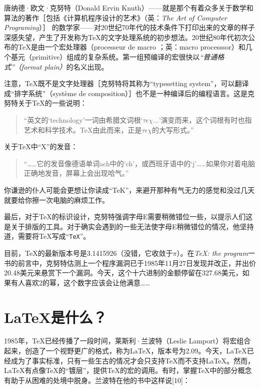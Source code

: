 唐纳德·欧文·克努特（Donald Ervin Knuth）——就是那个有着众多关于数学和算法的著作［包括《计算机程序设计的艺术》（英：\textit{The Art of Computer Programing}）］%
的数学家——对20世纪70年代的技术条件下打印出来的文章的样子深感失望，产生了开发称为\TeX 的文字处理系统的初步想法。20世纪80年代初次公布的\TeX 是由一个宏处理器（processeur de macro ；英：macro processsor）和几个基元（primitive）组成的复杂系统。第一组预编译的宏很快以\textit{“普通格式”（format plain）}的名义出现。

注意，\TeX 既不是文字处理器［克努特将其称为“typesetting system”，可以翻译成“排字系统”（système de composition）］也不是一种编译后的编程语言。这是克努特关于\TeX 的一些说明：

\begin{quote}
    “英文的‘technology’一词由希腊文词根‘$ \tau\epsilon\chi...$’演变而来，这个词根有时也指艺术和科学技术。\TeX 由此而来，正是$ \tau\epsilon\chi$的大写形式。”
\end{quote}

关于\TeX 中“X”的发音：

\begin{quote}
    “……它的发音像德语单词ach中的‘ch’，或西班牙语中的‘j’……如果你对着电脑正确地发音，屏幕上会出现哈气。”
\end{quote}

你谦逊的仆人可能会更想让你读成“TeK”，来避开那种有气无力的感觉和没过几天就要给你擦一次电脑的麻烦工作。

最后，对于\TeX 的标识设计，克努特强调字母E需要稍微错位一些，以提示人们这是关于排版的工具。对于确实会遇到的一些无法使字母E稍微错位的情况，他坚持道，需要将\TeX 写成“\texttt{TeX}”。

目前，\TeX 的最新版本号是3.1415926（没错，它收敛于$\pi$）。在\textit{\TeX : the program}一书的前言中，克努特估测上一个程序漏洞已于1985年11月27日发现并改正，并出价20.48美元来悬赏下一个漏洞。今天，这个十六进制的金额停留在327.68美元，如果有人喜欢2的幂，这个数字应该会让他满意……

\section*{\LaTeX 是什么？}

1985年，\TeX 已经传播了一段时间，莱斯利·兰波特（Leslie Lamport）将宏组合起来，创造了一个视野更广的格式，称为\LaTeX ，版本号为2.09。今天，\LaTeX 已经成为了事实标准，只有一些玍古的情况才会只支持\TeX 而不支持\LaTeX 。然而，\LaTeX 有点像\TeX 的“镀层”，提供\TeX 的宏的调用。有时，掌握\TeX 中的部分概念有助于从困难的处境中脱身。兰波特在他的书中这样说[10]：%

